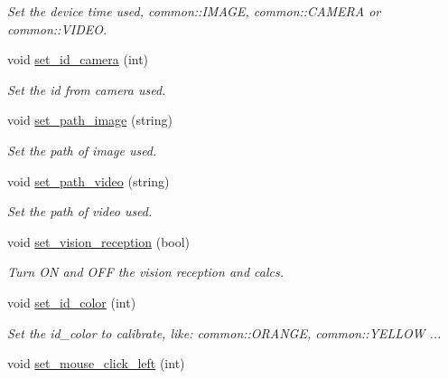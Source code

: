 \begin{DoxyCompactItemize}
\begin{DoxyCompactList}\small\item\em Set the device time used, common\+::\+I\+M\+A\+GE, common\+::\+C\+A\+M\+E\+RA or common\+::\+V\+I\+D\+EO. \end{DoxyCompactList}\item 
void \hyperlink{classcalibration_aee45977e438474eb1111964a827a8ff9}{set\+\_\+id\+\_\+camera} (int)\hypertarget{classcalibration_aee45977e438474eb1111964a827a8ff9}{}\label{classcalibration_aee45977e438474eb1111964a827a8ff9}

\begin{DoxyCompactList}\small\item\em Set the id from camera used. \end{DoxyCompactList}\item 
void \hyperlink{classcalibration_a2eacc8d2c839f71182d3ec0440056ee7}{set\+\_\+path\+\_\+image} (string)\hypertarget{classcalibration_a2eacc8d2c839f71182d3ec0440056ee7}{}\label{classcalibration_a2eacc8d2c839f71182d3ec0440056ee7}

\begin{DoxyCompactList}\small\item\em Set the path of image used. \end{DoxyCompactList}\item 
void \hyperlink{classcalibration_ac4b64b95163be3bfdfb13c2d23592756}{set\+\_\+path\+\_\+video} (string)\hypertarget{classcalibration_ac4b64b95163be3bfdfb13c2d23592756}{}\label{classcalibration_ac4b64b95163be3bfdfb13c2d23592756}

\begin{DoxyCompactList}\small\item\em Set the path of video used. \end{DoxyCompactList}\item 
void \hyperlink{classcalibration_a5a1d0ee04511fc9a61767d3bb3f4e357}{set\+\_\+vision\+\_\+reception} (bool)
\begin{DoxyCompactList}\small\item\em Turn ON and O\+FF the vision reception and calcs. \end{DoxyCompactList}\item 
void \hyperlink{classcalibration_a6e2c50598a4f5d49c6d7bda23b69ddf3}{set\+\_\+id\+\_\+color} (int)\hypertarget{classcalibration_a6e2c50598a4f5d49c6d7bda23b69ddf3}{}\label{classcalibration_a6e2c50598a4f5d49c6d7bda23b69ddf3}

\begin{DoxyCompactList}\small\item\em Set the id\+\_\+color to calibrate, like\+: common\+::\+O\+R\+A\+N\+GE, common\+::\+Y\+E\+L\+L\+OW ... \end{DoxyCompactList}\item 
void \hyperlink{classcalibration_aaaf40baef708cb370c468ea0799ffaf6}{set\+\_\+mouse\+\_\+click\+\_\+left} (int)\hypertarget{classcalibration_aaaf40baef708cb370c468ea0799ffaf6}{}\label{classcalibration_aaaf40baef708cb370c468ea0799ffaf6}


\end{DoxyCompactItemize}
